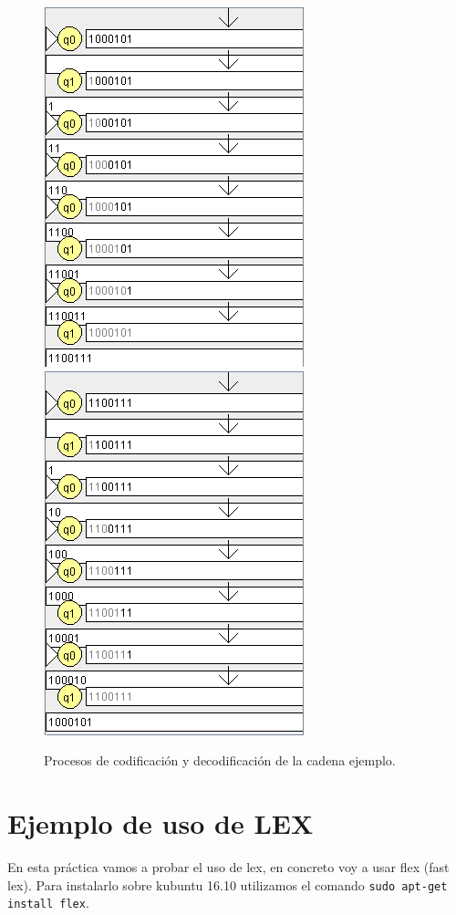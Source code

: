 \begin{figure}[H]
	\centering
	\includegraphics[scale=0.8]{ej-codifica.png}
	\includegraphics[scale=0.8]{ej-decodifica.png}
	\caption{Procesos de codificación y decodificación de la cadena ejemplo.}
\end{figure}

\section{Ejemplo de uso de LEX}
En esta práctica vamos a probar el uso de lex, en concreto voy a usar flex (fast lex). Para instalarlo sobre kubuntu 16.10 utilizamos el comando \verb|sudo apt-get install flex|.

